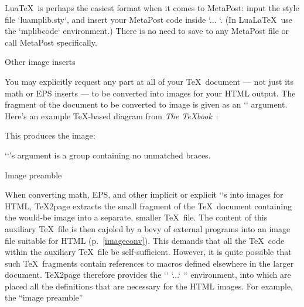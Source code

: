 {{{{{{{{{
%
Lua\TeX\ is perhaps the easiest format when it comes to MetaPost:
input the style file `luamplib.sty`, and insert your MetaPost
code inside `\mplibcode ... \endmplibcode`. (In Lua\LaTeX\ use
the `{mplibcode}` environment.) There is no need to save to any
MetaPost file or call MetaPost specifically.

\beginsection Other image inserts

%
%
You may explicitly request any part at all of your \TeX\
document — not just its math or EPS inserts —
to be converted into images for your HTML output.  The
fragment of the document to be converted to image is
given as an `\makehtmlimage` argument.
Here’s an example \TeX-based diagram from {\em
The \TeX book}~\cite[p.~389]{texbook}:



\n This produces the  image:

\smallskip

\smallskip

\n `\makehtmlimage`’s argument is a group containing
no unmatched braces.

\beginsection Image preamble

%
When converting math, EPS, and other implicit or
explicit `\htmlimage`s into images for HTML, \TeX2page
extracts the small fragment of the \TeX\ document
containing the would-be image into a separate, smaller
\TeX\ file.  The content of this auxiliary \TeX\ file is
then cajoled by a bevy of external programs into
an image file suitable for HTML (p.~\ref{imageconv}).  This demands that
all the \TeX\ code within the auxiliary \TeX\ file be
self-sufficient.  However, it is quite possible that
such \TeX\ fragments contain references to macros
defined elsewhere in the larger document.
\TeX2page therefore provides the `\imgpreamble`
`...` `\endimgpreamble` environment, into which
are placed all the definitions that are necessary for
the HTML images.   For example, the “image preamble”

}}}}}}}}}
